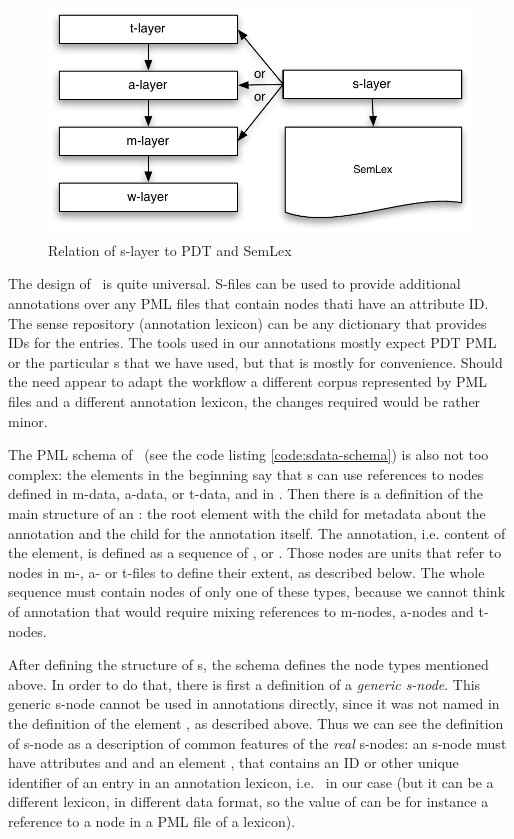 \begin{figure}
   \centering
   \includegraphics[scale=.5]{images/layers-with-s-layer.pdf} %
   \caption{Relation of s-layer to PDT and SemLex}
    \label{fig:s-layer}
\end{figure}


The design of \sdata\ is quite universal. S-files can be used to provide additional annotations over any PML files that contain nodes thati have an attribute ID. The sense repository (annotation lexicon) can be any dictionary that provides IDs for the entries. The tools used in our annotations mostly expect PDT PML or the particular \sf{}s that we have used, but that is mostly for convenience. Should the need appear to adapt the workflow a different corpus represented by PML files and a different annotation lexicon, the changes required would be rather minor.

The PML schema of \sdata\ (see the code listing \ref{code:sdata-schema}) is also not too complex: the elements  in the beginning say that \sf{}s can use references to nodes defined in m-data, a-data, or t-data, and in \semlex. Then there is a definition of the main structure of an \sf: the root element  with the child  for metadata about the annotation and the child  for the annotation itself. The annotation, i.e. content of the  element, is defined as a sequence of , or . Those nodes are units that refer to nodes in m-, a- or t-files to define their extent, as described below. The whole sequence must contain nodes of only one of these types, because we cannot think of annotation that would require mixing references to m-nodes, a-nodes and t-nodes.

After defining the structure of \sf{}s, the schema defines the node types mentioned above. In order to do that, there is first a definition of a \emph{generic s-node}. This generic s-node cannot be used in annotations directly, since it was not named in the definition of the element , as described above. Thus we can see the definition of s-node as a description of common features of the \emph{real} s-nodes: an s-node must have attributes  and  and an element , that contains an ID or other unique identifier of an entry in an annotation lexicon, i.e. \semlex\ in our case (but it can be a different lexicon, in different data format, so the value of  can be for instance a reference to a node in a PML file of a lexicon). 

